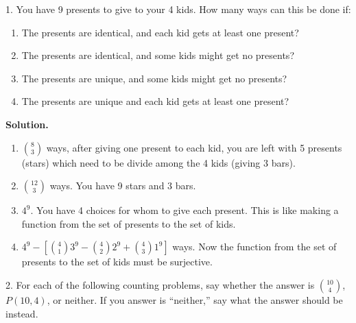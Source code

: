 \documentclass[10pt,]{book}
\theoremstyle{plain}
\theoremstyle{definition}
\theoremstyle{definition}
\theoremstyle{definition}
\numberwithin{equation}{section}
\begin{document}
\begin{exerciselist}
\item[1.]\hypertarget{exercise-102}{}
            You have 9 presents to give to your 4 kids. How many ways can this be done if:
\leavevmode%
\begin{enumerate}[label=(\alph*)]
\item\hypertarget{li-659}{}
                The presents are identical, and each kid gets at least one present?
\item\hypertarget{li-660}{}
                The presents are identical, and some kids might get no presents?
\item\hypertarget{li-661}{}
                The presents are unique, and some kids might get no presents?
\item\hypertarget{li-662}{}
                The presents are unique and each kid gets at least one present?
\end{enumerate}
\par\smallskip
\par\smallskip
\noindent\textbf{Solution.}\hypertarget{solution-153}{}\quad

            \leavevmode%
\begin{enumerate}[label=(\alph*)]
\item\hypertarget{li-663}{}\({8 \choose 3}\) ways, after giving one present to each kid, you are left with 5 presents (stars) which need to be divide among the 4 kids (giving 3 bars).%
\item\hypertarget{li-664}{}\({12 \choose 3}\) ways. You have 9 stars and 3 bars.%
\item\hypertarget{li-665}{}\(4^9\). You have 4 choices for whom to give each present. This is like making a function from the set of presents to the set of kids.%
\item\hypertarget{li-666}{}\(4^9 - \left[{4 \choose 1}3^9 - {4\choose 2}2^9 + {4 \choose 3}1^9 \right]\) ways. Now the function from the set of presents to the set of kids must be surjective.%
\end{enumerate}

\item[2.]\hypertarget{exercise-103}{}
            For each of the following counting problems, say whether the answer is \({10\choose 4}\), \(P(10,4)\), or neither.
            If you answer is ``neither,'' say what the answer should be instead.


\end{exerciselist}
\end{document}
